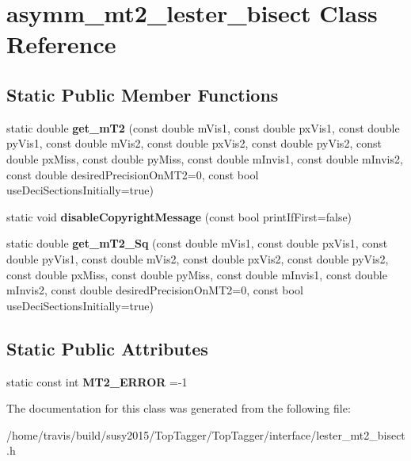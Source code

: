 \hypertarget{classasymm__mt2__lester__bisect}{\section{asymm\-\_\-mt2\-\_\-lester\-\_\-bisect Class Reference}
\label{classasymm__mt2__lester__bisect}
}
\subsection*{Static Public Member Functions}
\begin{DoxyCompactItemize}
\item 
\hypertarget{classasymm__mt2__lester__bisect_a13110c1f7824a39e18c2ee9ecea5909e}{static double {\bfseries get\-\_\-m\-T2} (const double m\-Vis1, const double px\-Vis1, const double py\-Vis1, const double m\-Vis2, const double px\-Vis2, const double py\-Vis2, const double px\-Miss, const double py\-Miss, const double m\-Invis1, const double m\-Invis2, const double desired\-Precision\-On\-M\-T2=0, const bool use\-Deci\-Sections\-Initially=true)}\label{classasymm__mt2__lester__bisect_a13110c1f7824a39e18c2ee9ecea5909e}

\item 
\hypertarget{classasymm__mt2__lester__bisect_a01fd3fe6227bf51b1c589e150670d849}{static void {\bfseries disable\-Copyright\-Message} (const bool print\-If\-First=false)}\label{classasymm__mt2__lester__bisect_a01fd3fe6227bf51b1c589e150670d849}

\item 
\hypertarget{classasymm__mt2__lester__bisect_a6a5aa8b70f0ee049609a07890bdff1e9}{static double {\bfseries get\-\_\-m\-T2\-\_\-\-Sq} (const double m\-Vis1, const double px\-Vis1, const double py\-Vis1, const double m\-Vis2, const double px\-Vis2, const double py\-Vis2, const double px\-Miss, const double py\-Miss, const double m\-Invis1, const double m\-Invis2, const double desired\-Precision\-On\-M\-T2=0, const bool use\-Deci\-Sections\-Initially=true)}\label{classasymm__mt2__lester__bisect_a6a5aa8b70f0ee049609a07890bdff1e9}

\end{DoxyCompactItemize}
\subsection*{Static Public Attributes}
\begin{DoxyCompactItemize}
\item 
\hypertarget{classasymm__mt2__lester__bisect_a0686f7e583fcb2c86ab5638837b1f318}{static const int {\bfseries M\-T2\-\_\-\-E\-R\-R\-O\-R} =-\/1}\label{classasymm__mt2__lester__bisect_a0686f7e583fcb2c86ab5638837b1f318}

\end{DoxyCompactItemize}


The documentation for this class was generated from the following file\-:\begin{DoxyCompactItemize}
\item 
/home/travis/build/susy2015/\-Top\-Tagger/\-Top\-Tagger/interface/lester\-\_\-mt2\-\_\-bisect.\-h\end{DoxyCompactItemize}
